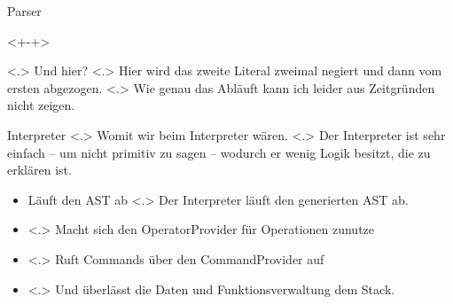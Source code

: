 \begin{frame}{Parser}
\begin{itemize}[<+- | alert@+>]
{            }
        \begin{uncoverenv}<+-+>%
        \end{uncoverenv}
            \note[item]<.>{
              Und hier?
            }
            \note[item]<.>{
              Hier wird das zweite Literal zweimal negiert und dann vom ersten abgezogen.
            }
            \note[item]<.>{
              Wie genau das Abläuft kann ich leider aus Zeitgründen nicht zeigen.
            }
    \end{itemize}
  \end{frame}

  \begin{frame}{Interpreter}
    \vspace*{1em}%
    \pause
        \note[item]<.>{
          Womit wir beim Interpreter wären.
        }
        \note[item]<.>{
          Der Interpreter ist sehr einfach -- um nicht primitiv zu sagen -- wodurch er wenig Logik besitzt, die zu erklären ist.
        }
    \begin{itemize}[<+- | alert@+>]
      \item Läuft den AST ab
          \note[item]<.>{
            Der Interpreter läuft den generierten AST ab.
          }
      \item {}
          \note[item]<.>{
            Macht sich den OperatorProvider für Operationen zunutze
          }
      \item {}
          \note[item]<.>{
            Ruft Commands über den CommandProvider auf
          }
      \item {}
          \note[item]<.>{
            Und überlässt die Daten und Funktionsverwaltung dem Stack.
          }
    \end{itemize}
  \end{frame}

